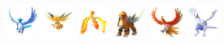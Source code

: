 \documentclass[12pt]{beamer}
\begin{document}
\begin{frame}
\begin{footnotesize}
\begin{block}{}
\begin{center}
    \includegraphics[width=1.5cm]{../../images/pokemon/articuno.png}
    \includegraphics[width=1.5cm]{../../images/pokemon/zapdos.png}
    \includegraphics[width=1.5cm]{../../images/pokemon/moltres.png}
    \includegraphics[width=1.5cm]{../../images/pokemon/entei.png}
    \includegraphics[width=1.5cm]{../../images/pokemon/ho-oh.png}
    \includegraphics[width=1.5cm]{../../images/pokemon/lugia.png}
    \end{center}
\end{block}

\end{footnotesize}
\end{frame}


\end{document}

